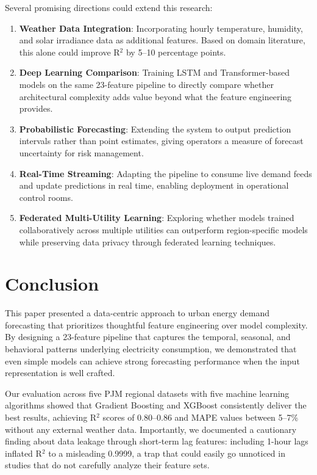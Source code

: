 \documentclass[conference]{IEEEtran}
\begin{document}
Several promising directions could extend this research:
\begin{enumerate}
    \item \textbf{Weather Data Integration}: Incorporating hourly temperature, humidity, and solar irradiance data as additional features. Based on domain literature, this alone could improve R$^{2}$ by 5--10 percentage points.
    \item \textbf{Deep Learning Comparison}: Training LSTM and Transformer-based models on the same 23-feature pipeline to directly compare whether architectural complexity adds value beyond what the feature engineering provides.
    \item \textbf{Probabilistic Forecasting}: Extending the system to output prediction intervals rather than point estimates, giving operators a measure of forecast uncertainty for risk management.
    \item \textbf{Real-Time Streaming}: Adapting the pipeline to consume live demand feeds and update predictions in real time, enabling deployment in operational control rooms.
    \item \textbf{Federated Multi-Utility Learning}: Exploring whether models trained collaboratively across multiple utilities can outperform region-specific models while preserving data privacy through federated learning techniques.
\end{enumerate}

\section{Conclusion}

This paper presented a data-centric approach to urban energy demand forecasting that prioritizes thoughtful feature engineering over model complexity. By designing a 23-feature pipeline that captures the temporal, seasonal, and behavioral patterns underlying electricity consumption, we demonstrated that even simple models can achieve strong forecasting performance when the input representation is well crafted.

Our evaluation across five PJM regional datasets with five machine learning algorithms showed that Gradient Boosting and XGBoost consistently deliver the best results, achieving R$^{2}$ scores of 0.80--0.86 and MAPE values between 5--7\% without any external weather data. Importantly, we documented a cautionary finding about data leakage through short-term lag features: including 1-hour lags inflated R$^{2}$ to a misleading 0.9999, a trap that could easily go unnoticed in studies that do not carefully analyze their feature sets.
\end{document}
